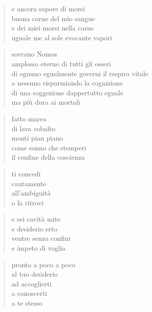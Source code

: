 	\begin{verse}
		e ancora sapore di morsi\\
		buona carne del mio sangue\\
		e dei miei morsi nella carne\\
		uguale me al sole evocante vapori
	\end{verse}

\clearpage


\vspace*{2cm}

	\begin{verse}
		sovrano Nomos\\
		amplesso eterno di tutti gli esseri\\
		di ognuno egualmente governi il respiro vitale\\
		a nessuno risparmiando la cognizione\\
		di una soggezione dappertutto eguale\\
		ma più dura ai mortali
	\end{verse}

\clearpage


\vspace*{2cm}

	\begin{verse}
		fatto marea\\
		di lava cobalto\\
		monti pian piano\\
		come sonno che stemperi\\
		il confine della coscienza
	\end{verse}

	\begin{verse}
		ti concedi\\
		cautamente\\
		all’ambiguità\\
		o la ritrovi
	\end{verse}

	\begin{verse}
		e sei cavità mite\\
		e desiderio erto\\
		ventre senza confini\\
		e impeto di voglia
	\end{verse}

	\begin{verse}
		pronto a poco a poco\\
		al tuo desiderio\\
		ad accoglierti\\
		a conoscerti\\
		a te stesso
	\end{verse}

